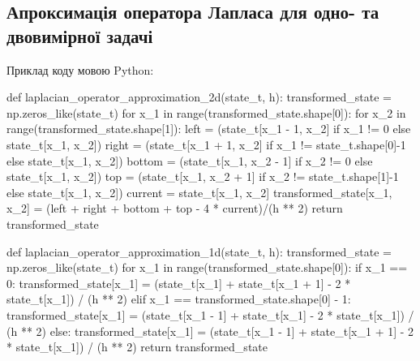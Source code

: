 \documentclass[a4paper,12pt]{extreport}
\begin{document}
\subsection*{Апроксимація оператора Лапласа для одно- та двовимірної задачі}
Приклад коду мовою Python:
\begin{python}
def laplacian_operator_approximation_2d(state_t, h):
    transformed_state = np.zeros_like(state_t)
    for x_1 in range(transformed_state.shape[0]):
        for x_2 in range(transformed_state.shape[1]):
            left = (state_t[x_1 - 1, x_2] if x_1 != 0 else state_t[x_1, x_2])
            right = (state_t[x_1 + 1, x_2] if x_1 != state_t.shape[0]-1 else state_t[x_1, x_2])
            bottom = (state_t[x_1, x_2 - 1] if x_2 != 0 else state_t[x_1, x_2])
            top = (state_t[x_1, x_2 + 1] if x_2 != state_t.shape[1]-1 else state_t[x_1, x_2])
            current = state_t[x_1, x_2]
            transformed_state[x_1, x_2] = (left + right + bottom + top - 4 * current)/(h ** 2)
    return transformed_state


def laplacian_operator_approximation_1d(state_t, h):
    transformed_state = np.zeros_like(state_t)
    for x_1 in range(transformed_state.shape[0]):
        if x_1 == 0:
            transformed_state[x_1] = (state_t[x_1] + state_t[x_1 + 1] - 2 * state_t[x_1]) / (h ** 2)
        elif x_1 == transformed_state.shape[0] - 1:
            transformed_state[x_1] = (state_t[x_1 - 1] + state_t[x_1] - 2 * state_t[x_1]) / (h ** 2)
        else:
             transformed_state[x_1] = (state_t[x_1 - 1] + state_t[x_1 + 1] - 2 * state_t[x_1]) / (h ** 2)
    return transformed_state
\end{python}
\end{document}
